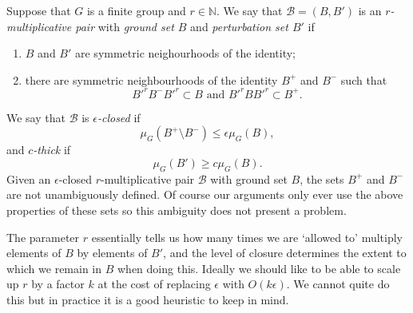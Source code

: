 \documentclass[12pt]{amsart}
\numberwithin{equation}{section}
\theoremstyle{plain}
\theoremstyle{definition}
\renewcommand{\leq}{\leqslant}
\renewcommand{\geq}{\geqslant}
\newcommand{\N}{\mathbb{N}}
\begin{document}
Suppose that $G$ is a finite group and $r \in \N$. We say that $\mathcal{B}=(B,B')$ is an \emph{$r$-multiplicative pair} with \emph{ground set $B$} and \emph{perturbation set $B'$} if
\begin{enumerate}
\item $B$ and $B'$ are symmetric neighourhoods of the identity;
\item there are symmetric neighbourhoods of the identity $B^+$ and $B^-$ such that
\begin{equation*}
B'^rB^-B'^r \subset B \textrm{ and } B'^rBB'^r \subset B^+.
\end{equation*}
\end{enumerate}
We say that $\mathcal{B}$ is \emph{$\epsilon$-closed} if
\begin{equation*}
\mu_G(B^+\setminus B^-) \leq \epsilon\mu_G(B),
\end{equation*}
and \emph{$c$-thick} if
\begin{equation*}
\mu_G(B') \geq c\mu_G(B).
\end{equation*}
Given an $\epsilon$-closed $r$-multiplicative pair $\mathcal{B}$ with ground set $B$, the sets $B^+$ and $B^-$ are not unambiguously defined.  Of course our arguments only ever use the above properties of these sets so this ambiguity does not present a problem.

The parameter $r$ essentially tells us how many times we are `allowed to' multiply elements of $B$ by elements of $B'$, and the level of closure determines the extent to which we remain in $B$ when doing this.  Ideally we should like to be able to scale up $r$ by a factor $k$ at the cost of replacing $\epsilon$ with $O(k\epsilon)$.  We cannot quite do this but in practice it is a good heuristic to keep in mind.
\end{document}
